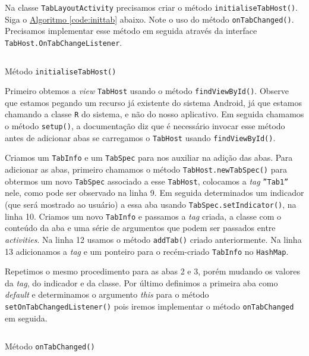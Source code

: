 \documentclass[a4paper,12pt,brazil,oneside]{book}
\begin{document}
\begin{singlespace}
	Na classe \texttt{TabLayoutActivity} precisamos criar o método \texttt{initialiseTabHost()}. Siga o \hyperref[code:inittab]{Algoritmo \ref*{code:inittab}} abaixo. Note o uso do método \texttt{onTabChanged()}. Precisamos implementar esse método em seguida através da interface \texttt{TabHost.OnTabChangeListener}.
	
	\begin{listing}[H]
	\inputminted[linenos=true,fontsize=\small,frame=lines, framesep=2mm, tabsize=2,numbersep=5pt]{java}{src/design/intialiseTabHost.java}
	\caption{Método \texttt{initialiseTabHost()}}
	\label{code:inittab}
	\end{listing}
	
	Primeiro obtemos a \emph{view} \texttt{TabHost} usando o método \texttt{findViewById()}. Observe que estamos pegando um recurso já existente do sistema Android, já que estamos chamando a classe \texttt{R} do sistema, e não do nosso aplicativo. Em seguida chamamos o método \texttt{setup()}, a documentação diz que é necessário invocar esse método antes de adicionar abas se carregamos o \texttt{TabHost} usando \texttt{findViewById()}.
	
	Criamos um \texttt{TabInfo} e um \texttt{TabSpec} para nos auxiliar na adição das abas. Para adicionar as abas, primeiro chamamos o método \texttt{TabHost.newTabSpec()} para obtermos um novo \texttt{TabSpec} associado a esse \texttt{TabHost}, colocamos a \emph{tag} \texttt{''Tab1''} nele, como pode ser observado na linha 9. Em seguida determinados um indicador (que será mostrado ao usuário) a essa aba usando \texttt{TabSpec.setIndicator()}, na linha 10. Criamos um novo \texttt{TabInfo} e passamos a \emph{tag} criada, a classe com o conteúdo da aba e uma série de argumentos que podem ser passados entre \emph{activities}. Na linha 12 usamos o método \texttt{addTab()} criado anteriormente. Na linha 13 adicionamos a \emph{tag} e um ponteiro para o recém-criado \texttt{TabInfo} no \texttt{HashMap}.
	
	Repetimos o mesmo procedimento para as abas 2 e 3, porém mudando os valores da \emph{tag}, do indicador e da classe. Por último definimos a primeira aba como \emph{default} e determinamos o argumento \emph{this} para o método \texttt{setOnTabChangedListener()} pois iremos implementar o método \texttt{onTabChanged} em seguida.
	
	\begin{listing}[H]
	\inputminted[linenos=true,fontsize=\small,frame=lines, framesep=2mm, tabsize=2,numbersep=5pt]{java}{src/design/ontabchanged.java}
	\caption{Método \texttt{onTabChanged()}}
	\end{listing}
	

\end{singlespace}
\end{document}
